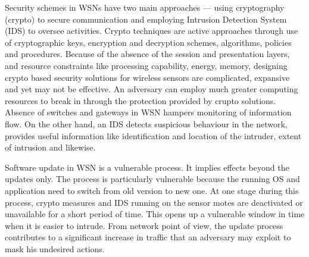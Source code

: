 \documentclass[conference,final]{IEEEtran}
\begin{document}
Security schemes in WSNs have two main approaches --- using cryptography (crypto) to secure communication and  employing Intrusion Detection System (IDS) to oversee activities.
Crypto techniques are active approaches through use of cryptographic keys, encryption and decryption schemes, algorithms, policies and procedures.
Because  of the absence of the session and presentation layers, and resource constraints like processing capability, energy, memory, designing crypto based security solutions for wireless sensors are complicated, expansive and yet may not be effective.
An adversary can employ much greater computing resources to break in through the protection provided by crupto solutions.
Absence of switches and gateways in WSN hampers monitoring of information flow.
On the other hand, an IDS detects suspicious behaviour in the network, provides useful information like identification and location of the intruder, extent of intrusion and likewise.


Software update in WSN is a vulnerable process.
It implies effects beyond the updates only.
The process is particularly vulnerable because the running OS and application need to switch from old version to new one. 
At one stage during this process, crypto measures and IDS running on the sensor motes are deactivated or unavailable for a short period of time.
This opens up a vulnerable window in time when it is easier to intrude.
From network point of view, the update process contributes to a significant increase in traffic that an adversary may exploit to  mask his undesired actions. 
\end{document}
